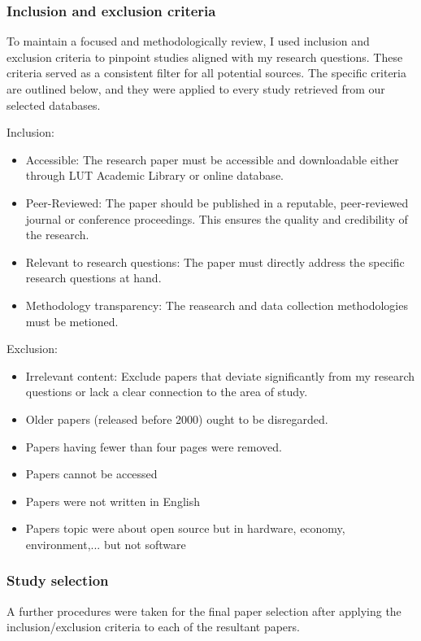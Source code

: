 \subsubsection{Inclusion and exclusion criteria}

To maintain a focused and methodologically review, I used inclusion and exclusion criteria to pinpoint studies aligned with my research questions. These criteria served as a consistent filter for all potential sources. The specific criteria are outlined below, and they were applied to every study retrieved from our selected databases. 

Inclusion:
\begin{itemize}
    \item Accessible: The research paper must be accessible and downloadable either through LUT Academic Library or online database. 
    \item Peer-Reviewed: The paper should be published in a reputable, peer-reviewed journal or conference proceedings. This ensures the quality and credibility of the research.
    \item Relevant to research questions: The paper must directly address the specific research questions at hand.
    \item Methodology transparency: The reasearch and data collection  methodologies must be metioned. 
\end{itemize}

Exclusion:
\begin{itemize}
    \item Irrelevant content: Exclude papers that deviate significantly from my research questions or lack a clear connection to the area of study.
    \item Older papers (released before 2000) ought to be disregarded.
    \item Papers having fewer than four pages were removed.
    \item Papers cannot be accessed
    \item Papers were not written in English
    \item Papers topic were about open source but in hardware, economy, environment,... but not software
\end{itemize}

\subsubsection{Study selection}
A further procedures were taken for the final paper selection after applying the inclusion/exclusion criteria to each of the resultant papers.


